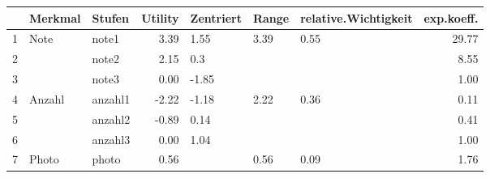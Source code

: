 \begin{table}[ht]
\centering
\begin{tabular}{rllrlllr}
  \hline
 & Merkmal & Stufen & Utility & Zentriert & Range & relative.Wichtigkeit & exp.koeff. \\ 
  \hline
1 & Note & note1 & 3.39 & 1.55 & 3.39 & 0.55 & 29.77 \\ 
  2 &  & note2 & 2.15 & 0.3 &  &  & 8.55 \\ 
  3 &  & note3 & 0.00 & -1.85 &  &  & 1.00 \\ 
  4 & Anzahl & anzahl1 & -2.22 & -1.18 & 2.22 & 0.36 & 0.11 \\ 
  5 &  & anzahl2 & -0.89 & 0.14 &  &  & 0.41 \\ 
  6 &  & anzahl3 & 0.00 & 1.04 &  &  & 1.00 \\ 
  7 & Photo & photo & 0.56 &  & 0.56 & 0.09 & 1.76 \\ 
   \hline
\end{tabular}
\end{table}
